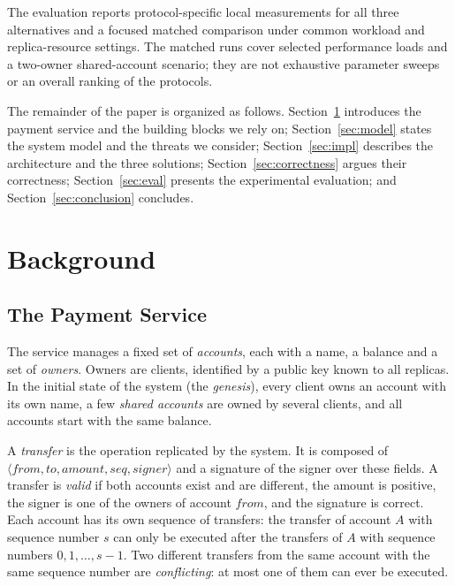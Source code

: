 \documentclass[sigconf,a4paper]{acmart}
\begin{document}
    The evaluation reports protocol-specific local measurements for all three
    alternatives and a focused matched comparison under common workload and
    replica-resource settings. The matched runs cover selected performance
    loads and a two-owner shared-account scenario; they are not exhaustive
    parameter sweeps or an overall ranking of the protocols.

    The remainder of the paper is organized as follows. Section~\ref{sec:background}
    introduces the payment service and the building blocks we rely on;
    Section~\ref{sec:model} states the system model and the threats we consider;
    Section~\ref{sec:impl} describes the architecture and the three solutions;
    Section~\ref{sec:correctness} argues their correctness;
    Section~\ref{sec:eval} presents the experimental evaluation; and
    Section~\ref{sec:conclusion} concludes.

    \section{Background}
    \label{sec:background}

    \subsection{The Payment Service}

    The service manages a fixed set of \emph{accounts}, each with a name, a
    balance and a set of \emph{owners}. Owners are clients, identified by a public
    key known to all replicas. In the initial state of the system (the
    \emph{genesis}), every client owns an account with its own name, a few
    \emph{shared accounts} are owned by several clients, and all accounts start
    with the same balance.

    A \emph{transfer} is the operation replicated by the system. It is composed of
    $\langle from, to, amount, seq, signer\rangle$ and a signature of the signer
    over these fields. A transfer is \emph{valid} if both accounts exist and are
    different, the amount is positive, the signer is one of the owners of account
    $from$, and the signature is correct. Each account has its own sequence of
    transfers: the transfer of account $A$ with sequence number $s$ can only be
    executed after the transfers of $A$ with sequence numbers $0,1,\ldots,s-1$.
    Two different transfers from the same account with the same sequence number
    are \emph{conflicting}: at most one of them can ever be executed.
\end{document}
